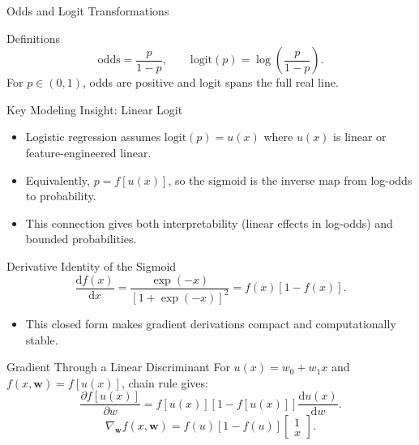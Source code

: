 \documentclass[10pt]{beamer}
\begin{document}
\begin{frame}{Odds and Logit Transformations}
  \justifying
  \begin{conceptbox}{Definitions}
    \[
      \text{odds} = \frac{p}{1-p},
      \qquad
      \mathrm{logit}(p)=\log\!\left(\frac{p}{1-p}\right).
    \]
    For $p\in(0,1)$, odds are positive and logit spans the full real line.
  \end{conceptbox}
\end{frame}

\begin{frame}{Key Modeling Insight: Linear Logit}
  \justifying
  \begin{itemize}
    \item Logistic regression assumes $\mathrm{logit}(p)=u(x)$ where $u(x)$ is linear or feature-engineered linear.
    \item Equivalently, $p=f[u(x)]$, so the sigmoid is the inverse map from log-odds to probability.
    \item This connection gives both interpretability (linear effects in log-odds) and bounded probabilities.
  \end{itemize}
\end{frame}

\begin{frame}{Derivative Identity of the Sigmoid}
  \justifying
  \begin{equation*}
    \frac{\mathrm{d}f(x)}{\mathrm{d}x}
    = \frac{\exp(-x)}{\left[1+\exp(-x)\right]^2}
    = f(x)\left[1-f(x)\right].
  \end{equation*}
  \begin{itemize}
    \item This closed form makes gradient derivations compact and computationally stable.
  \end{itemize}
\end{frame}

\begin{frame}{Gradient Through a Linear Discriminant}
  \justifying
  For $u(x)=w_0+w_1x$ and $f(x,\bm{w})=f[u(x)]$, chain rule gives:
  \begin{equation*}
    \frac{\partial f[u(x)]}{\partial w}
    = f[u(x)]\left[1-f[u(x)]\right]\frac{\mathrm{d}u(x)}{\mathrm{d}w}.
  \end{equation*}
  \begin{equation*}
    \nabla_{\bm{w}}f(x,\bm{w}) = f(u)[1-f(u)]
    \begin{bmatrix}1\\x
    \end{bmatrix}.
  \end{equation*}
\end{frame}
\end{document}
